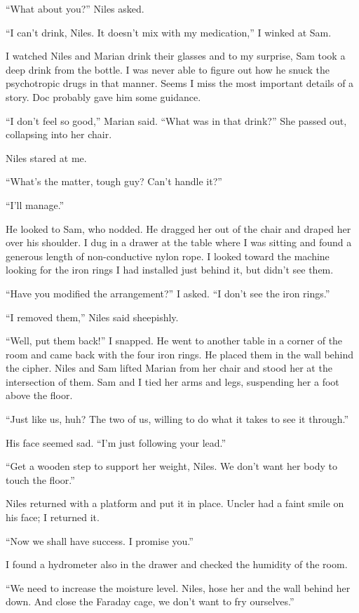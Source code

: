``What about you?'' Niles asked.

``I can't drink, Niles. It doesn't mix with my medication,'' I winked at
Sam.

I watched Niles and Marian drink their glasses and to my surprise, Sam
took a deep drink from the bottle. I was never able to figure out how he
snuck the psychotropic drugs in that manner. Seems I miss the most
important details of a story. Doc probably gave him some guidance.

``I don't feel so good,'' Marian said. ``What was in that drink?'' She
passed out, collapsing into her chair.

Niles stared at me.

``What's the matter, tough guy? Can't handle it?''

``I'll manage.''

He looked to Sam, who nodded. He dragged her out of the chair and draped
her over his shoulder. I dug in a drawer at the table where I was
sitting and found a generous length of non-conductive nylon rope. I
looked toward the machine looking for the iron rings I had installed
just behind it, but didn't see them.

``Have you modified the arrangement?'' I asked. ``I don't see the iron
rings.''

``I removed them,'' Niles said sheepishly.

``Well, put them back!'' I snapped. He went to another table in a corner
of the room and came back with the four iron rings. He placed them in
the wall behind the cipher. Niles and Sam lifted Marian from her chair
and stood her at the intersection of them. Sam and I tied her arms and
legs, suspending her a foot above the floor.

``Just like us, huh? The two of us, willing to do what it takes to see
it through.''

His face seemed sad. ``I'm just following your lead.''

``Get a wooden step to support her weight, Niles. We don't want her body
to touch the floor.''

Niles returned with a platform and put it in place. Uncler had a faint
smile on his face; I returned it.

``Now we shall have success. I promise you.''

I found a hydrometer also in the drawer and checked the humidity of the
room.

``We need to increase the moisture level. Niles, hose her and the wall
behind her down. And close the Faraday cage, we don't want to fry
ourselves.''

